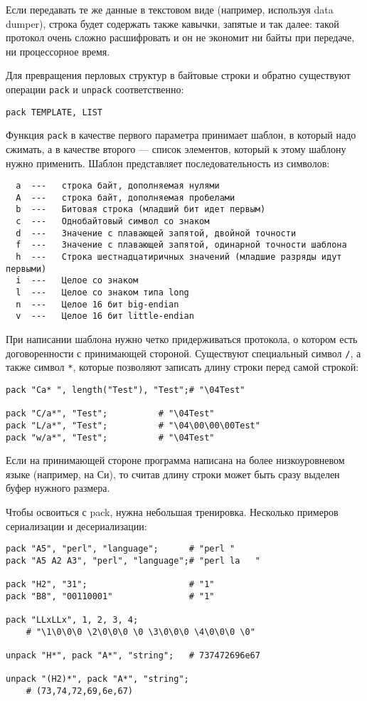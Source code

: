 Если передавать те же данные в текстовом виде (например, используя data dumper), строка будет содержать также кавычки, запятые и так далее: такой протокол очень сложно расшифровать и он не экономит ни байты при передаче, ни процессорное время.

Для превращения перловых структур в байтовые строки и обратно существуют операции \verb|pack| и \verb|unpack| соответственно:
\begin{verbatim}
pack TEMPLATE, LIST
\end{verbatim}
Функция \verb|pack| в качестве первого параметра принимает шаблон, в который надо сжимать, а в качестве второго --- список элементов, который к этому шаблону нужно применить. Шаблон представляет последовательность из символов:
\begin{verbatim}
  a  ---   строка байт, дополняемая нулями
  A  ---   строка байт, дополняемая пробелами
  b  ---   Битовая строка (младший бит идет первым)
  с  ---   Однобайтовый символ со знаком
  d  ---   Значение с плавающей запятой, двойной точности
  f  ---   Значение с плавающей запятой, одинарной точности шаблона
  h  ---   Строка шестнадцатиричных значений (младшие разряды идут    первыми)
  i  ---   Целое со знаком
  l  ---   Целое со знаком типа long
  n  ---   Целое 16 бит big-endian
  v  ---   Целое 16 бит little-endian
\end{verbatim}
При написании шаблона нужно четко придерживаться протокола, о котором есть договоренности с принимающей стороной. Существуют специальный символ \verb|/|, а также символ \verb|*|, которые позволяют записать длину строки перед самой строкой:
\begin{verbatim}
pack "Ca* ", length("Test"), "Test";# "\04Test"

pack "C/a*", "Test";          # "\04Test"
pack "L/a*", "Test";          # "\04\00\00\00Test"
pack "w/a*", "Test";          # "\04Test"
\end{verbatim}
Если на принимающей стороне программа написана на более низкоуровневом языке (например, на Си), то считав длину строки может быть сразу выделен буфер нужного размера.

Чтобы освоиться с pack, нужна небольшая тренировка. Несколько примеров сериализации и десериализации:
\begin{verbatim}
pack "A5", "perl", "language";      # "perl "
pack "A5 A2 A3", "perl", "language";# "perl la   "

pack "H2", "31";                    # "1"
pack "B8", "00110001"               # "1"

pack "LLxLLx", 1, 2, 3, 4;
    # "\1\0\0\0 \2\0\0\0 \0 \3\0\0\0 \4\0\0\0 \0"

unpack "H*", pack "A*", "string";   # 737472696e67

unpack "(H2)*", pack "A*", "string";
    # (73,74,72,69,6e,67)
\end{verbatim}

